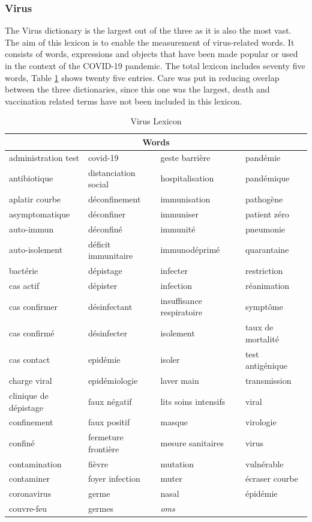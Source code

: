 \subsubsection{Virus}

The Virus dictionary is the largest out of the three as it is also the most vast. The aim of this lexicon is to enable the measurement of virus-related words. It consists of words, expressions and objects that have been made popular or used in the context of the COVID-19 pandemic. The total lexicon includes seventy five words, Table \ref{tab:virus lexicon} shows twenty five entries. Care was put in reducing overlap between the three dictionaries, since this one was the largest, death and vaccination related terms have not been included in this lexicon.


\begin{table}[H]
\centering
\begin{tabular}{@{}llll@{}}
\toprule
\multicolumn{4}{c}{\textbf{Words}} \\ \midrule
administration test & covid-19 & geste barrière & pandémie \\
antibiotique & distanciation social & hospitalisation & pandémique \\
aplatir courbe & déconfinement & immunisation & pathogène \\
asymptomatique & déconfiner & immuniser & patient zéro \\
auto-immun & déconfiné & immunité & pneumonie \\
auto-isolement & déficit immunitaire & immunodéprimé & quarantaine \\
bactérie & dépistage & infecter & restriction \\
cas actif & dépister & infection & réanimation \\
cas confirmer & désinfectant & insuffisance respiratoire & symptôme \\
cas confirmé & désinfecter & isolement & taux de mortalité \\
cas contact & epidémie & isoler & test antigénique \\
charge viral & epidémiologie & laver main & transmission \\
clinique de dépistage & faux négatif & lits soins intensifs & viral \\
confinement & faux positif & masque & virologie \\
confiné & fermeture frontière & mesure sanitaires & virus \\
contamination & fièvre & mutation & vulnérable \\
contaminer & foyer infection & muter & écraser courbe \\
coronavirus & germe & nasal & épidémie \\
couvre-feu & germes & \textit{oms} & \\
\bottomrule
\end{tabular}
\caption{Virus Lexicon}
\label{tab:virus lexicon}
\end{table}

